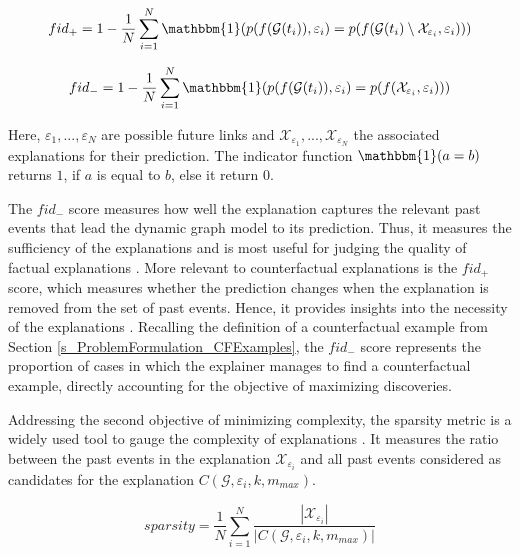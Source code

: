 \begin{equation}
    fid_+ = 1 - \frac{1}{N} \sum_{i = 1}^N \mathbbm{1}(p(f(\mathcal{G}(t_i)), \varepsilon_i) = p(f(\mathcal{G}(t_i) \setminus \mathcal{X}_{\varepsilon_i}, \varepsilon_i))) 
\end{equation}

\begin{equation}
    fid_- = 1 - \frac{1}{N} \sum_{i = 1}^N \mathbbm{1}(p(f(\mathcal{G}(t_i)), \varepsilon_i) = p(f(\mathcal{X}_{\varepsilon_i}, \varepsilon_i)))
\end{equation}

Here, $\varepsilon_1, ..., \varepsilon_N$ are possible future links and $\mathcal{X}_{\varepsilon_1},...,\mathcal{X}_{\varepsilon_N}$ the associated explanations for their prediction. The indicator function $\mathbbm{1}(a = b)$ returns $1$, if $a$ is equal to $b$, else it return $0$.

The $fid_-$ score measures how well the explanation captures the relevant past events that lead the dynamic graph model to its prediction. Thus, it measures the sufficiency of the explanations and is most useful for judging the quality of factual explanations \cite{amara_graphframex_2022}. More relevant to counterfactual explanations is the $fid_+$ score, which measures whether the prediction changes when the explanation is removed from the set of past events. Hence, it provides insights into the necessity of the explanations \cite{amara_graphframex_2022}. Recalling the definition of a counterfactual example from Section \ref{s_ProblemFormulation_CFExamples}, the $fid_-$ score represents the proportion of cases in which the explainer manages to find a counterfactual example, directly accounting for the objective of maximizing discoveries.


Addressing the second objective of minimizing complexity, the sparsity metric is a widely used tool to gauge the complexity of explanations \cite{yuan_explainability_2020, amara_graphframex_2022, prado-romero_survey_2023}. It measures the ratio between the past events in the explanation $\mathcal{X}_{\varepsilon_i}$ and all past events considered as candidates for the explanation $C(\mathcal{G}, \varepsilon_i, k, m_{max})$.

\begin{equation}
    sparsity = \frac{1}{N} \sum_{i = 1}^N \frac{|\mathcal{X}_{\varepsilon_i}|}{|C(\mathcal{G}, \varepsilon_i, k, m_{max})|}
\end{equation}

